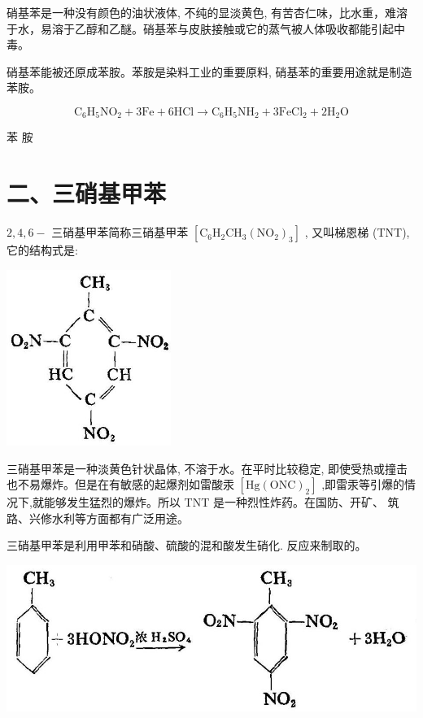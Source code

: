 \documentclass[10pt]{article}
\begin{document}
硝基苯是一种没有颜色的油状液体, 不纯的显淡黄色, 有苦杏仁味，比水重，难溶于水，易溶于乙醇和乙醚。硝基苯与皮肤接触或它的蒸气被人体吸收都能引起中毒。

硝基苯能被还原成苯胺。苯胺是染料工业的重要原料, 硝基苯的重要用途就是制造苯胺。

\[
{\mathrm{C}}_{6}{\mathrm{H}}_{5}{\mathrm{{NO}}}_{2} + 3\mathrm{{Fe}} + 6\mathrm{{HCl}} \rightarrow {\mathrm{C}}_{6}{\mathrm{H}}_{5}{\mathrm{{NH}}}_{2} + 3{\mathrm{{FeCl}}}_{2} + 2{\mathrm{H}}_{2}\mathrm{O}
\]

苯 胺

\section*{二、三硝基甲苯}

\(2,4,6 -\) 三硝基甲苯简称三硝基甲苯 \(\left\lbrack {{\mathrm{C}}_{6}{\mathrm{H}}_{2}{\mathrm{{CH}}}_{3}{\left( {\mathrm{{NO}}}_{2}\right) }_{3}}\right\rbrack\) , 又叫梯恩梯 (TNT), 它的结构式是:

\begin{center}
\includegraphics[max width=0.4\textwidth]{images/01912d16-be99-77bb-9535-4f3ed8d9946f_150_889380.jpg}
\end{center}

三硝基甲苯是一种淡黄色针状晶体, 不溶于水。在平时比较稳定, 即使受热或撞击也不易爆炸。但是在有敏感的起爆剂如雷酸汞 \(\left\lbrack {\mathrm{{Hg}}{\left( \mathrm{{ONC}}\right) }_{2}}\right\rbrack\) ,即雷汞等引爆的情况下,就能够发生猛烈的爆炸。所以 TNT 是一种烈性炸药。在国防、开矿、 筑路、兴修水利等方面都有广泛用途。

三硝基甲苯是利用甲苯和硝酸、硫酸的混和酸发生硝化. 反应来制取的。

\begin{center}
\includegraphics[max width=1.0\textwidth]{images/01912d16-be99-77bb-9535-4f3ed8d9946f_150_536417.jpg}
\end{center}
\end{document}

